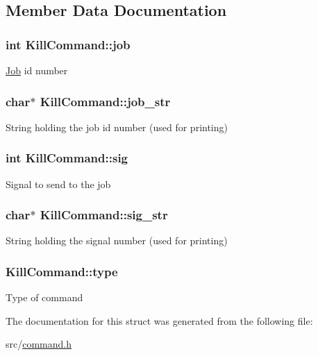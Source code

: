 \subsection{Member Data Documentation}
\hypertarget{structKillCommand_abd4689c605a3dfe202a1779f0d1191ae}{
\subsubsection[{job}]{\setlength{\rightskip}{0pt plus 5cm}int Kill\-Command\-::job}}\label{structKillCommand_abd4689c605a3dfe202a1779f0d1191ae}
\hyperlink{structJob}{Job} id number \hypertarget{structKillCommand_a174a9714a69550b0bbf611e59bfbf332}{
\subsubsection[{job\-\_\-str}]{\setlength{\rightskip}{0pt plus 5cm}char$\ast$ Kill\-Command\-::job\-\_\-str}}\label{structKillCommand_a174a9714a69550b0bbf611e59bfbf332}
String holding the job id number (used for printing) \hypertarget{structKillCommand_a20f5367bbec80a936189c57b1f9db351}{
\subsubsection[{sig}]{\setlength{\rightskip}{0pt plus 5cm}int Kill\-Command\-::sig}}\label{structKillCommand_a20f5367bbec80a936189c57b1f9db351}
Signal to send to the job \hypertarget{structKillCommand_a879a36b90427ec640bef5c92a6c9c24e}{
\subsubsection[{sig\-\_\-str}]{\setlength{\rightskip}{0pt plus 5cm}char$\ast$ Kill\-Command\-::sig\-\_\-str}}\label{structKillCommand_a879a36b90427ec640bef5c92a6c9c24e}
String holding the signal number (used for printing) \hypertarget{structKillCommand_a9cd678bc0659f74340e3fca28766bcda}{
\subsubsection[{type}]{ Kill\-Command\-::type}}\label{structKillCommand_a9cd678bc0659f74340e3fca28766bcda}
Type of command 

The documentation for this struct was generated from the following file\-:\begin{DoxyCompactItemize}
\item 
src/\hyperlink{command_8h}{command.\-h}\end{DoxyCompactItemize}
